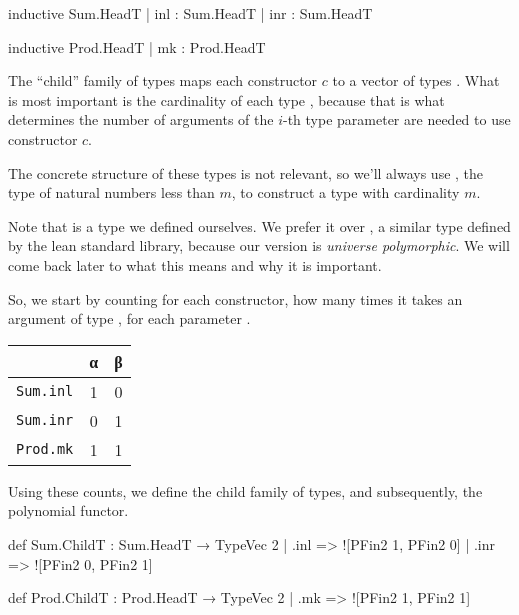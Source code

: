 \documentclass[titlepage]{report}
\newenvironment{remark}[1][Remark:]{\begin{trivlist}                         
    \item[\hskip \labelsep {\bfseries #1}]}{\end{trivlist}}
\begin{document}
\begin{center}
    \begin{minipage}[t]{0.45\linewidth}
        \begin{leancode}
    inductive Sum.HeadT
      | inl : Sum.HeadT
      | inr : Sum.HeadT
        \end{leancode}
    \end{minipage}
    \begin{minipage}[t]{0.45\linewidth}
        \begin{leancode}    
    inductive Prod.HeadT
      | mk : Prod.HeadT
        \end{leancode}
    \end{minipage}
\end{center}

The ``child'' family of types maps each constructor $c$ to a vector of types .
What is most important is the cardinality of each type , 
because that is what determines the number of arguments of the $i$-th type parameter are needed
to use constructor $c$. 

The concrete structure of these types is not relevant, so we'll always use , the type
of natural numbers less than $m$, to construct a type with cardinality $m$.

\begin{remark}
    Note that  is a type we defined ourselves. We prefer it over , a similar
    type defined by the lean standard library, because our version is \emph{universe polymorphic}.
    We will come back later to what this means and why it is important.
\end{remark}

So, we start by counting for each constructor, how many times it takes an argument of type ,
for each parameter .
\begin{center}
\begin{tabular}{l|c|c}
    & α & β \\ \hline
    \texttt{Sum.inl}  & 1 & 0 \\
    \texttt{Sum.inr}  & 0 & 1 \\
    \texttt{Prod.mk}  & 1 & 1 \\    
\end{tabular}    
\end{center}

Using these counts, we define the child family of types, and subsequently, the polynomial functor.

\begin{center}
  \begin{leancode}
    def Sum.ChildT : Sum.HeadT → TypeVec 2
      | .inl => ![PFin2 1, PFin2 0]
      | .inr => ![PFin2 0, PFin2 1]

    def Prod.ChildT : Prod.HeadT → TypeVec 2
      | .mk  => ![PFin2 1, PFin2 1]
  \end{leancode}
\end{center}
\end{document}
